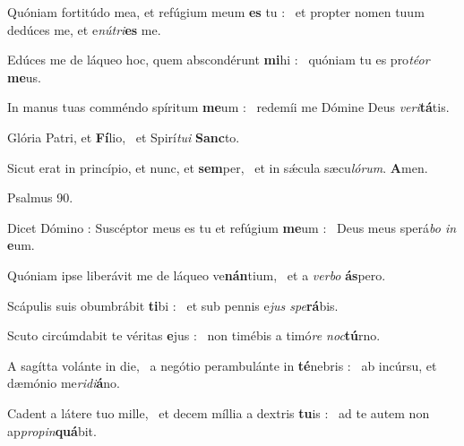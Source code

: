 \documentclass[12pt]{article} %
\def\noinitial{%
\gresetfirstlineaboveinitial{\textcolor{benred8}{\small \textsc{\textbf{}}}}{\textcolor{benred8}{\small \textsc{\textbf{}}}}
\setspaceafterinitial{0pt plus 0em minus 0em}%
\setspacebeforeinitial{0pt plus 0em minus 0em}%
\relax %
}
\newenvironment{psalmtext}{\leftskip 0.25in}{\vspace{1 mm}}
\let\oldgresixstar\gresixstar
\renewcommand{\gresixstar}{\textcolor{benred8}{\oldgresixstar}}
\let\oldgredagger\gredagger
\renewcommand{\gredagger}{\textcolor{benred8}{\oldgredagger}}
\begin{document}
\begin{pages}
\begin{Leftside}
\begin{psalmtext}
Qu\'{o}niam fortit\'{u}do mea, et ref\'{u}gium meum \textbf{es} tu : \gresixstar\ et propter nomen tuum ded\'{u}ces me, et e\emph{n\'{u}tri}\textbf{es} me.

Ed\'{u}ces me de l\'{a}queo hoc, quem abscond\'{e}runt \textbf{mi}hi : \gresixstar\ qu\'{o}niam tu es pro\emph{t\'{e}or} \textbf{me}us.

In manus tuas comm\'{e}ndo sp\'{i}ritum \textbf{me}um : \gresixstar\ redem\'{i}i me D\'{o}mine Deus \emph{veri}\textbf{t\'{a}}tis.

Gl\'{o}ria Patri, et \textbf{F\'{i}}lio, \gresixstar\ et Spir\'{i}\emph{tui} \textbf{Sanc}to.

Sicut erat in princ\'{i}pio, et nunc, et \textbf{sem}per, \gresixstar\ et in s\'{\ae}cula s\ae cu\emph{l\'{o}rum}. \textbf{A}men.

\end{psalmtext}

\pend\pstart


{
\centering
\textcolor{benred8}{Psalmus 90.}

}

\pend\pstart

{\noinitial
{}

}

\pend\pstart

\begin{psalmtext}
Dicet D\'{o}mino : Susc\'{e}ptor meus es tu et ref\'{u}gium \textbf{me}um : \gresixstar\ Deus meus sper\'{a}\emph{bo in} \textbf{e}um.

Qu\'{o}niam ipse liber\'{a}vit me de l\'{a}queo ve\textbf{n\'{a}n}tium, \gresixstar\ et a \emph{verbo} \textbf{\'{a}s}pero.

Sc\'{a}pulis suis obumbr\'{a}bit \textbf{ti}bi : \gresixstar\ et sub pennis e\emph{jus spe}\textbf{r\'{a}}bis.

Scuto circ\'{u}mdabit te v\'{e}ritas \textbf{e}jus : \gresixstar\ non tim\'{e}bis a tim\'{o}\emph{re noc}\textbf{t\'{u}}rno.

A sag\'{i}tta vol\'{a}nte in die, \gredagger\ a neg\'{o}tio perambul\'{a}nte in \textbf{t\'{e}}nebris : \gresixstar\ ab inc\'{u}rsu, et d\ae m\'{o}nio me\emph{ridi}\textbf{\'{a}}no.

Cadent a l\'{a}tere tuo mille, \gredagger\ et decem m\'{i}llia a dextris \textbf{tu}is : \gresixstar\ ad te autem non ap\emph{propin}\textbf{qu\'{a}}bit.


\end{psalmtext}
\end{Leftside}
\end{pages}
\end{document}
